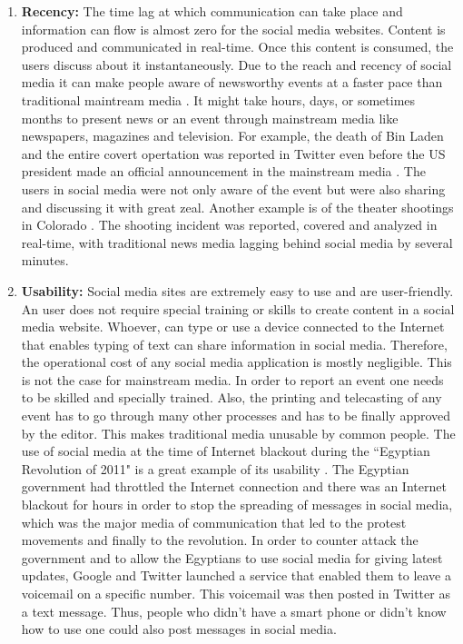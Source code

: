 \begin{enumerate}
\item \textbf{Recency:} The time lag at which communication can take place and information can flow is almost zero for the social media websites. Content is produced and communicated in real-time. Once this content is consumed, the users discuss about it instantaneously. Due to the reach and recency of social media it can make people aware of newsworthy events at a faster pace than traditional maintream media \cite{phelan2009using,petrovic2013can}. It might take hours, days, or sometimes months to present news or an event through mainstream media like newspapers, magazines and television. For example, the death of Bin Laden and the entire covert opertation was reported in Twitter even before the US president made an official announcement in the mainstream media \cite{ladendeathnews}. The users in social media were not only aware of the event but were also sharing and discussing it with great zeal.  Another example is of the theater shootings in Colorado \cite{coloradoshooting}. The shooting incident was reported, covered and analyzed in real-time, with traditional news media lagging behind social media by several minutes.

\item \textbf{Usability:} Social media sites are extremely easy to use and are user-friendly. An user does not require special training or skills to create content in a social media website. Whoever, can type or use a device connected to the Internet that enables typing of text can share information in social media. Therefore, the operational cost of any social media application is mostly negligible. This is not the case for mainstream media. In order to report an event one needs to be skilled and specially trained. Also, the printing and telecasting of any event has to go through many other processes and has to be finally approved by the editor. This makes traditional media unusable by common people. The use of social media at the time of Internet blackout during the ``Egyptian Revolution of 2011" is a great example of its usability \cite{egyptianrevinternetblackout}. The Egyptian government had throttled the Internet connection and there was an Internet blackout for hours in order to stop the spreading of messages in social media, which was the major media of communication that led to the protest movements and finally to the revolution. In order to counter attack the government and to allow the Egyptians to use social media for giving latest updates, Google and Twitter launched a service that enabled them to leave a voicemail on a specific number. This voicemail was then posted in Twitter as a text message. Thus, people who didn't have a smart phone or didn't know how to use one could also post messages in social media.


\end{enumerate}

